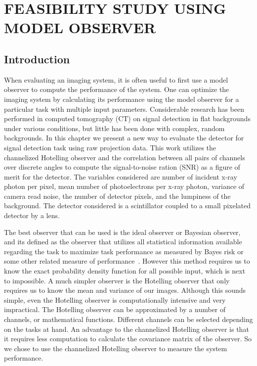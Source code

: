 \chapter{FEASIBILITY STUDY USING MODEL OBSERVER}
\label{chap:model_observer}

\section{Introduction}
When evaluating an imaging system, it is often useful to first use a model observer to compute the performance of the system.  One can optimize the imaging system by calculating its performance using the model observer for a particular task with multiple input parameters.  Considerable research has been performed in computed tomography (CT) on signal detection in flat backgrounds under various conditions, but little has been done with complex, random backgrounds.  In this chapter we present a new way to evaluate the detector for signal detection task using raw projection data.  This work utilizes the channelized Hotelling observer and the correlation between all pairs of channels over discrete angles to compute the signal-to-noise ration (SNR) as a figure of merit for the detector.  The variables considered are number of incident x-ray photon per pixel, mean number of photoelectrons per x-ray photon, variance of camera read noise, the number of detector pixels, and the lumpiness of the background.  The detector considered is a scintillator coupled to a small pixelated detector by a lens.

The best observer that can be used is the ideal observer or Bayesian observer, and its defined as the observer that utilizes all statistical information available regarding the task to maximize task performance as measured by Bayes risk or some other related measure of performance~\citep{Barrett2004, Barrett2013}.  However this method requires us to know the exact probability density function for all possible input, which is next to impossible.  A much simpler observer is the Hotelling observer that only requires us to know the mean and variance of our images.  Although this sounds simple, even the Hotelling observer is computationally intensive and very impractical.  The Hotelling observer can be approximated by a number of channels, or mathematical functions.  Different channels can be selected depending on the tasks at hand.  An advantage to the channelized Hotelling observer is that it requires less computation to calculate the covariance matrix of the observer.  So we chose to use the channelized Hotelling observer to measure the system performance.

